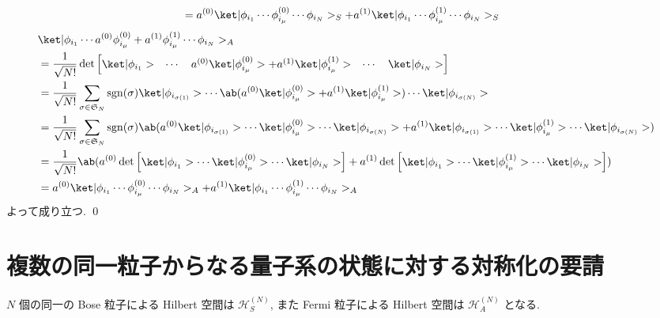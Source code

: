 \documentclass[uplatex,dvipdfmx,a4paper,11pt]{jlreq}
\makeatletter
\DeclareMathOperator{\sgn}{sgn}
\newcommand{\HH}{\mathcal{H}}
\renewcommand{\SS}{\mathfrak{S}}
\numberwithin{equation}{section}
\theoremstyle{definition}
\renewenvironment{proof}[1][\proofname]{\par
  \normalfont
  \topsep6\p@\@plus6\p@ \trivlist
  \item[\hskip\labelsep{\bfseries #1}\@addpunct{\bfseries}]\ignorespaces\quad\par
}{%
  \qed\endtrivlist\@endpefalse
}
\renewcommand\proofname{証明}
\makeatother
\begin{document}
\begin{proof}
\begin{align}
     & = a^{(0)}\ket|\phi_{i_1}\cdots\phi_{i_\mu}^{(0)}\cdots\phi_{i_N}>_S + a^{(1)}\ket|\phi_{i_1}\cdots\phi_{i_\mu}^{(1)}\cdots\phi_{i_N}>_S
  \end{align}
  \begin{align}
     & \ket|\phi_{i_1}\cdots a^{(0)}\phi_{i_\mu}^{(0)} + a^{(1)}\phi_{i_\mu}^{(1)}\cdots\phi_{i_N}>_A                                                                                                                                                               \\
     & = \frac{1}{\sqrt{N!}}\det\begin{bmatrix}\ket|\phi_{i_1}> & \cdots & a^{(0)}\ket|\phi_{i_\mu}^{(0)}> + a^{(1)}\ket|\phi_{i_\mu}^{(1)}> & \cdots & \ket|\phi_{i_N}>\end{bmatrix}                                                                               \\
     & = \frac{1}{\sqrt{N!}}\sum_{\sigma\in\SS_N}\sgn(\sigma)\ket|\phi_{i_{\sigma(1)}}>\cdots\ab(a^{(0)}\ket|\phi_{i_\mu}^{(0)}> + a^{(1)}\ket|\phi_{i_\mu}^{(1)}>)\cdots\ket|\phi_{i_{\sigma(N)}}>                                                                 \\
     & = \frac{1}{\sqrt{N!}}\sum_{\sigma\in\SS_N}\sgn(\sigma)\ab(a^{(0)}\ket|\phi_{i_{\sigma(1)}}>\cdots\ket|\phi_{i_\mu}^{(0)}>\cdots\ket|\phi_{i_{\sigma(N)}}> + a^{(1)}\ket|\phi_{i_{\sigma(1)}}>\cdots\ket|\phi_{i_\mu}^{(1)}>\cdots\ket|\phi_{i_{\sigma(N)}}>) \\
     & = \frac{1}{\sqrt{N!}}\ab(a^{(0)}\det\begin{bmatrix}\ket|\phi_{i_1}>\cdots\ket|\phi_{i_\mu}^{(0)}>\cdots\ket|\phi_{i_N}>\end{bmatrix} + a^{(1)}\det\begin{bmatrix}\ket|\phi_{i_1}>\cdots\ket|\phi_{i_\mu}^{(1)}>\cdots\ket|\phi_{i_N}>\end{bmatrix})          \\
     & = a^{(0)}\ket|\phi_{i_1}\cdots\phi_{i_\mu}^{(0)}\cdots\phi_{i_N}>_A + a^{(1)}\ket|\phi_{i_1}\cdots\phi_{i_\mu}^{(1)}\cdots\phi_{i_N}>_A
  \end{align}
  よって成り立つ.
\end{proof}

\section{複数の同一粒子からなる量子系の状態に対する対称化の要請}
\begin{definition}
  $N$ 個の同一の Bose 粒子による Hilbert 空間は $\HH_S^{(N)}$, また Fermi 粒子による Hilbert 空間は $\HH_A^{(N)}$ となる.
\end{definition}
\end{document}
